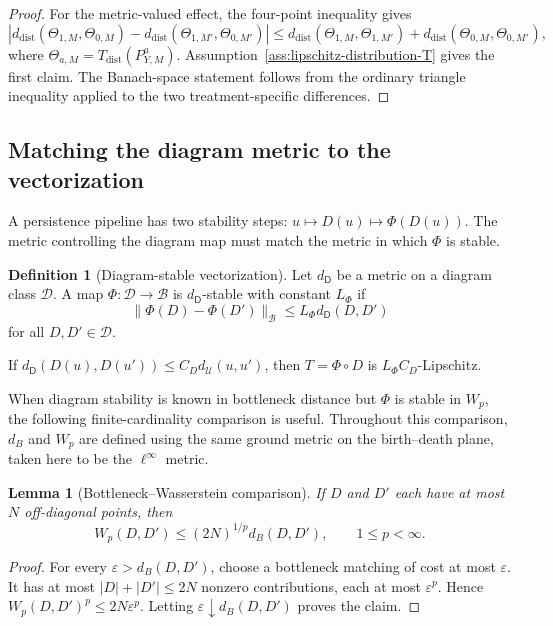 \documentclass[11pt,a4paper]{article}
\theoremstyle{plain}
\newtheorem{lemma}[theorem]{Lemma}
\theoremstyle{definition}
\newtheorem{definition}[theorem]{Definition}
\theoremstyle{remark}
\newcommand{\1}{\mathbbm{1}}
\begin{document}
\begin{proof}
For the metric-valued effect, the four-point inequality gives
\[
\left|
d_{\mathrm{dist}}(\Theta_{1,M},\Theta_{0,M})
-
d_{\mathrm{dist}}(\Theta_{1,M'},\Theta_{0,M'})
\right|
\leq
d_{\mathrm{dist}}(\Theta_{1,M},\Theta_{1,M'})
+
d_{\mathrm{dist}}(\Theta_{0,M},\Theta_{0,M'}),
\]
where
\(\Theta_{a,M}=T_{\mathrm{dist}}(P_{Y,M}^a)\).
Assumption~\ref{ass:lipschitz-distribution-T} gives the first claim. The Banach-space statement follows from the ordinary triangle inequality applied to the two treatment-specific differences.
\end{proof}

\subsection{Matching the diagram metric to the vectorization}
\label{subsec:diagram-metric}

A persistence pipeline has two stability steps:
\(u \longmapsto D(u) \longmapsto \Phi(D(u))\). The metric controlling the diagram map must match the metric in which \(\Phi\) is stable.

\begin{definition}[Diagram-stable vectorization]
\label{def:diagram-stable-summary}
Let \(d_{\mathsf D}\) be a metric on a diagram class \(\mathcal D\). A map \(\Phi:\mathcal D\to\mathcal B\) is
\(d_{\mathsf D}\)-stable with constant \(L_\Phi\) if
\[
\|\Phi(D)-\Phi(D')\|_{\mathcal B}
\leq
L_\Phi d_{\mathsf D}(D,D')
\]
for all \(D,D'\in\mathcal D\).
\end{definition}

If \(d_{\mathsf D}(D(u),D(u')) \leq C_Dd_{\mathcal U}(u,u')\), then \(T=\Phi\circ D\) is \(L_\Phi C_D\)-Lipschitz.

When diagram stability is known in bottleneck distance but
\(\Phi\) is stable in \(W_p\), the following finite-cardinality comparison is useful. Throughout this comparison, \(d_B\) and \(W_p\) are defined using the same ground metric on the birth--death plane, taken here to be the \(\ell^\infty\) metric.

\begin{lemma}[Bottleneck--Wasserstein comparison]
\label{lem:bottleneck-wasserstein}
If \(D\) and \(D'\) each have at most \(N\) off-diagonal points, then
\[
W_p(D,D')
\leq
(2N)^{1/p}d_B(D,D'),
\qquad 1\leq p<\infty.
\]
\end{lemma}

\begin{proof}
For every \(\varepsilon>d_B(D,D')\), choose a bottleneck matching of cost at most \(\varepsilon\). It has at most
\(|D|+|D'|\leq2N\) nonzero contributions, each at most
\(\varepsilon^p\). Hence \(W_p(D,D')^p\leq2N\varepsilon^p\). Letting \(\varepsilon\downarrow d_B(D,D')\) proves the claim.
\end{proof}
\end{document}

